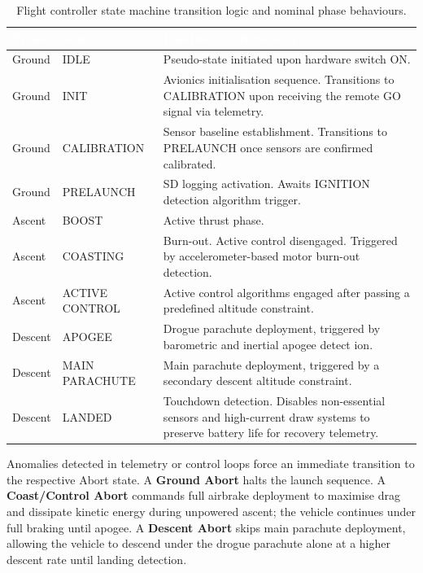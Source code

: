 \documentclass[11pt, a4paper]{article} %
\begin{document}
\begin{table}[H]
    \centering
    \caption{Flight controller state machine transition logic and nominal phase behaviours.}
    \label{tab:conops_states}
    \begin{tabularx}{\textwidth}{|l|l|X|}
        \hline
        \rowcolor{EtseNavy}
        \textbf{\textcolor{white}{Phase}} & \textbf{\textcolor{white}{State}} & \textbf{\textcolor{white}{Condition \& Behaviour}} \\ \hline
        Ground & IDLE & Pseudo-state initiated upon hardware switch ON. \\ \hline
        \rowcolor{LightGrayTable}
        Ground & INIT & Avionics initialisation sequence. Transitions to CALIBRATION upon receiving the remote GO signal via telemetry. \\ \hline
        Ground & CALIBRATION & Sensor baseline establishment. Transitions to PRELAUNCH once sensors are confirmed calibrated. \\ \hline
        \rowcolor{LightGrayTable}
        Ground & PRELAUNCH & SD logging activation. Awaits IGNITION detection algorithm trigger. \\ \hline
        Ascent & BOOST & Active thrust phase. \\ \hline
        \rowcolor{LightGrayTable}
        Ascent & COASTING & Burn-out. Active control disengaged. Triggered by accelerometer-based motor burn-out detection. \\ \hline
        Ascent & ACTIVE CONTROL & Active control algorithms engaged after passing a predefined altitude constraint. \\ \hline
        \rowcolor{LightGrayTable}
        Descent & APOGEE & Drogue parachute deployment, triggered by barometric and inertial apogee detect  ion. \\ \hline
        Descent & MAIN PARACHUTE & Main parachute deployment, triggered by a secondary descent altitude constraint. \\ \hline
        \rowcolor{LightGrayTable}
        Descent & LANDED & Touchdown detection. Disables non-essential sensors and high-current draw systems to preserve battery life for recovery telemetry. \\ \hline
    \end{tabularx}
\end{table}

Anomalies detected in telemetry or control loops force an immediate transition to the respective Abort state. A \textbf{Ground Abort} halts the launch sequence. A \textbf{Coast/Control Abort} commands full airbrake deployment to maximise drag and dissipate kinetic energy during unpowered ascent; the vehicle continues under full braking until apogee. A \textbf{Descent Abort} skips main parachute deployment, allowing the vehicle to descend under the drogue parachute alone at a higher descent rate until landing detection.
\end{document}
